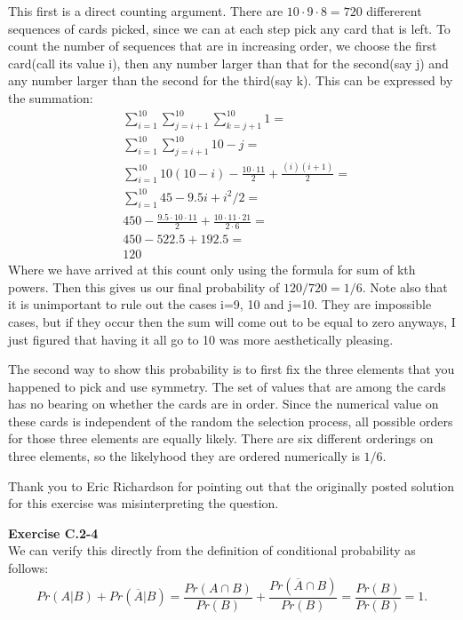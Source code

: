 \documentclass{article}
\begin{document}
This first is a direct counting argument. There are $10\cdot 9 \cdot 8=720$ differerent sequences of cards picked, since we can at each step pick any card that is left. To count the number of sequences that are in increasing order, we choose the first card(call its value i), then any number larger than that for the second(say j) and any number larger than the second for the third(say k). This can be expressed by the summation:
\begin{align*}
&\sum_{i=1}^{10} \sum_{j=i+1}^{10} \sum_{k=j+1}^{10} 1=\\
&\sum_{i=1}^{10} \sum_{j=i+1}^{10} 10-j=\\
&\sum_{i=1}^{10} 10(10-i) - \frac{10\cdot11}{2} + \frac{(i)(i+1)}{2}=\\
&\sum_{i=1}^{10} 45  - 9.5i +i^2/2=\\
&450 - \frac{9.5\cdot 10 \cdot 11}{2} + \frac{10\cdot11\cdot21}{2\cdot 6}=\\
&450 - 522.5 + 192.5 = \\
&120
\end{align*}
Where we have arrived at this count only using the formula for sum of kth powers. Then this gives us our final probability of $120/720 =1/6$. Note also that it is unimportant to rule out the cases i=9, 10 and j=10. They are impossible cases, but if they occur then the sum will come out to be equal to zero anyways, I just figured that having it all go to 10 was more aesthetically pleasing. 

The second way to show this probability is to first fix the three elements that you happened to pick and use symmetry. The set of values that are among the cards has no bearing on whether the cards are in order. Since the numerical value on these cards is independent of the random the selection process, all possible orders for those three elements are equally likely. There are six different orderings on three elements, so the likelyhood they are ordered numerically is $1/6$.

Thank you to Eric Richardson for pointing out that the originally posted solution for this exercise was misinterpreting the question.

\noindent\textbf{Exercise C.2-4}\\

We can verify this directly from the definition of conditional probability as follows:
\[Pr(A|B) + Pr(\overline{A} | B) = \frac{Pr(A \cap B)}{Pr(B)} + \frac{Pr(\overline{A} \cap B)}{Pr(B)} = \frac{Pr(B)}{Pr(B)} = 1.\]
\end{document}
